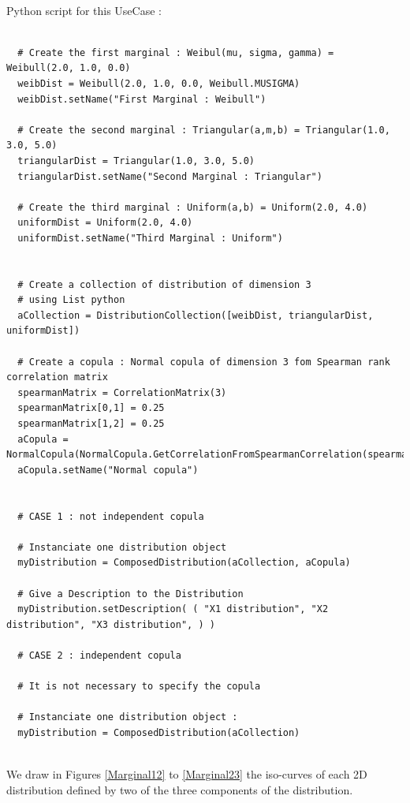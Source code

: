 \textspace\\
Python script for this UseCase :

\begin{lstlisting}

  # Create the first marginal : Weibul(mu, sigma, gamma) = Weibull(2.0, 1.0, 0.0)
  weibDist = Weibull(2.0, 1.0, 0.0, Weibull.MUSIGMA)
  weibDist.setName("First Marginal : Weibull")

  # Create the second marginal : Triangular(a,m,b) = Triangular(1.0, 3.0, 5.0)
  triangularDist = Triangular(1.0, 3.0, 5.0)
  triangularDist.setName("Second Marginal : Triangular")

  # Create the third marginal : Uniform(a,b) = Uniform(2.0, 4.0)
  uniformDist = Uniform(2.0, 4.0)
  uniformDist.setName("Third Marginal : Uniform")


  # Create a collection of distribution of dimension 3
  # using List python
  aCollection = DistributionCollection([weibDist, triangularDist, uniformDist])
  
  # Create a copula : Normal copula of dimension 3 fom Spearman rank correlation matrix
  spearmanMatrix = CorrelationMatrix(3)
  spearmanMatrix[0,1] = 0.25
  spearmanMatrix[1,2] = 0.25
  aCopula = NormalCopula(NormalCopula.GetCorrelationFromSpearmanCorrelation(spearmanMatrix))
  aCopula.setName("Normal copula")


  # CASE 1 : not independent copula

  # Instanciate one distribution object
  myDistribution = ComposedDistribution(aCollection, aCopula)

  # Give a Description to the Distribution
  myDistribution.setDescription( ( "X1 distribution", "X2 distribution", "X3 distribution", ) )

  # CASE 2 : independent copula

  # It is not necessary to specify the copula

  # Instanciate one distribution object :
  myDistribution = ComposedDistribution(aCollection)

\end{lstlisting}
\textspace\\
We draw in Figures \ref{Marginal12} to \ref{Marginal23} the iso-curves of each 2D distribution defined by two of the three components of the distribution.


